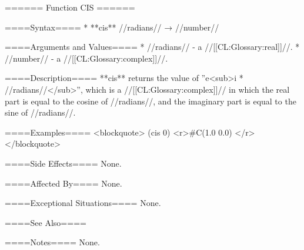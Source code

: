 ====== Function CIS ======

====Syntax====
  * **cis** //radians// → //number//

====Arguments and Values====
  * //radians// - a //[[CL:Glossary:real]]//.
  * //number// - a //[[CL:Glossary:complex]]//.

====Description====
**cis** returns the value of ''e<sub>i * //radians//</sub>'', which is a //[[CL:Glossary:complex]]// in which the real part is equal to the cosine of //radians//, and the imaginary part is equal to the sine of //radians//.

====Examples==== 
<blockquote> 
(cis 0) <r>#C(1.0 0.0) </r>
</blockquote>

====Side Effects====
None.

====Affected By====
None.

====Exceptional Situations====
None.

====See Also====
{\secref\FloatSubstitutability}

====Notes====
None.

